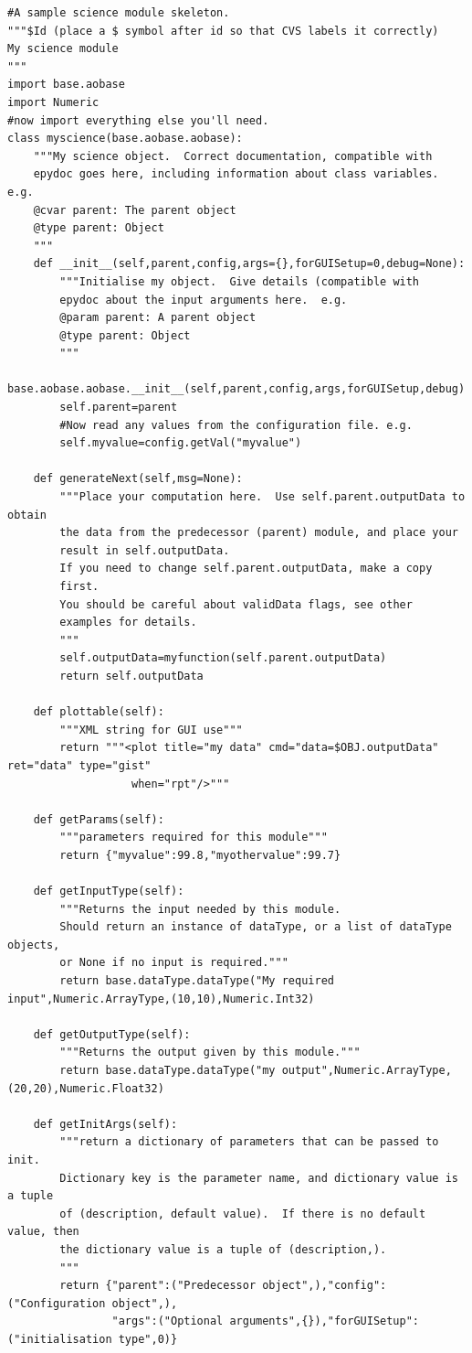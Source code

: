 \documentclass{article}
\begin{document}
\begin{verbatim}
#A sample science module skeleton.
"""$Id (place a $ symbol after id so that CVS labels it correctly)
My science module
"""
import base.aobase
import Numeric
#now import everything else you'll need.
class myscience(base.aobase.aobase):
    """My science object.  Correct documentation, compatible with
    epydoc goes here, including information about class variables. e.g.
    @cvar parent: The parent object
    @type parent: Object
    """
    def __init__(self,parent,config,args={},forGUISetup=0,debug=None):
        """Initialise my object.  Give details (compatible with
        epydoc about the input arguments here.  e.g.
        @param parent: A parent object
        @type parent: Object
        """
        base.aobase.aobase.__init__(self,parent,config,args,forGUISetup,debug)
        self.parent=parent
        #Now read any values from the configuration file. e.g.
        self.myvalue=config.getVal("myvalue")

    def generateNext(self,msg=None):
        """Place your computation here.  Use self.parent.outputData to obtain
        the data from the predecessor (parent) module, and place your
        result in self.outputData.
        If you need to change self.parent.outputData, make a copy
        first.
        You should be careful about validData flags, see other
        examples for details.
        """
        self.outputData=myfunction(self.parent.outputData)
        return self.outputData

    def plottable(self):
        """XML string for GUI use"""
        return """<plot title="my data" cmd="data=$OBJ.outputData" ret="data" type="gist"
                   when="rpt"/>"""

    def getParams(self):
        """parameters required for this module"""
        return {"myvalue":99.8,"myothervalue":99.7}

    def getInputType(self):
        """Returns the input needed by this module.
        Should return an instance of dataType, or a list of dataType objects,
        or None if no input is required."""
        return base.dataType.dataType("My required input",Numeric.ArrayType,(10,10),Numeric.Int32)

    def getOutputType(self):
        """Returns the output given by this module."""
        return base.dataType.dataType("my output",Numeric.ArrayType,(20,20),Numeric.Float32)

    def getInitArgs(self):
        """return a dictionary of parameters that can be passed to init.
        Dictionary key is the parameter name, and dictionary value is a tuple
        of (description, default value).  If there is no default value, then
        the dictionary value is a tuple of (description,).
        """
        return {"parent":("Predecessor object",),"config":("Configuration object",),
                "args":("Optional arguments",{}),"forGUISetup":("initialisation type",0)}

\end{verbatim}
\end{document}
